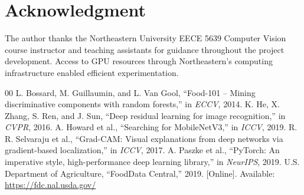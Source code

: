 \documentclass[conference]{IEEEtran}
\begin{document}
\section*{Acknowledgment}
The author thanks the Northeastern University EECE 5639 Computer Vision course instructor and teaching assistants for guidance throughout the project development. Access to GPU resources through Northeastern's computing infrastructure enabled efficient experimentation.

\begin{thebibliography}{00}
 L. Bossard, M. Guillaumin, and L. Van Gool, ``Food-101 -- Mining discriminative components with random forests,'' in \textit{ECCV}, 2014.
 K. He, X. Zhang, S. Ren, and J. Sun, ``Deep residual learning for image recognition,'' in \textit{CVPR}, 2016.
 A. Howard et al., ``Searching for MobileNetV3,'' in \textit{ICCV}, 2019.
 R. R. Selvaraju et al., ``Grad-CAM: Visual explanations from deep networks via gradient-based localization,'' in \textit{ICCV}, 2017.
 A. Paszke et al., ``PyTorch: An imperative style, high-performance deep learning library,'' in \textit{NeurIPS}, 2019.
 U.S. Department of Agriculture, ``FoodData Central,'' 2019. [Online]. Available: \url{https://fdc.nal.usda.gov/}
\end{thebibliography}
\end{document}
